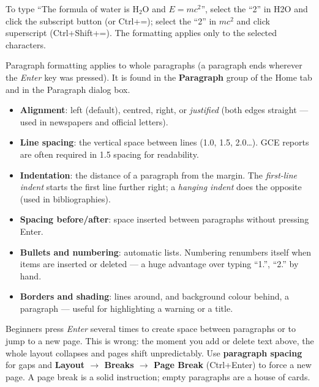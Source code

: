 \documentclass[11pt]{article}
\newcommand{\cle}[1]{{\popxbold\color{popdark}#1}}
\newcounter{popsec}
\newcounter{popsub}
\newcommand{\courssub}[1]{%
  \stepcounter{popsub}%
  \par\vspace{9pt}\noindent{\popxbold\fontsize{11.5}{13}\selectfont\color{popink}{\color{poporange}\thepopsec.\thepopsub}\hspace{6pt}#1}\par\nopagebreak\vspace{4pt}
}
\begin{document}
\begin{exemplebox}
To type ``The formula of water is H$_2$O and $E = mc^{2}$'', select the ``2'' in H2O and click the subscript button (or Ctrl+=); select the ``2'' in $mc^2$ and click superscript (Ctrl+Shift+=). The formatting applies only to the selected characters.
\end{exemplebox}

\courssub{Paragraph Formatting}

\cle{Paragraph formatting} applies to whole paragraphs (a paragraph ends wherever the \emph{Enter} key was pressed). It is found in the \textbf{Paragraph} group of the Home tab and in the Paragraph dialog box.

\begin{itemize}
\item \textbf{Alignment}: left (default), centred, right, or \emph{justified} (both edges straight — used in newspapers and official letters).
\item \textbf{Line spacing}: the vertical space between lines (1.0, 1.5, 2.0\ldots). GCE reports are often required in 1.5 spacing for readability.
\item \textbf{Indentation}: the distance of a paragraph from the margin. The \emph{first-line indent} starts the first line further right; a \emph{hanging indent} does the opposite (used in bibliographies).
\item \textbf{Spacing before/after}: space inserted between paragraphs without pressing Enter.
\item \textbf{Bullets and numbering}: automatic lists. Numbering renumbers itself when items are inserted or deleted — a huge advantage over typing ``1.'', ``2.'' by hand.
\item \textbf{Borders and shading}: lines around, and background colour behind, a paragraph — useful for highlighting a warning or a title.
\end{itemize}

\begin{attention}
Beginners press \emph{Enter} several times to create space between paragraphs or to jump to a new page. This is wrong: the moment you add or delete text above, the whole layout collapses and pages shift unpredictably. Use \textbf{paragraph spacing} for gaps and \textbf{Layout $\rightarrow$ Breaks $\rightarrow$ Page Break} (Ctrl+Enter) to force a new page. A page break is a solid instruction; empty paragraphs are a house of cards.
\end{attention}
\end{document}
